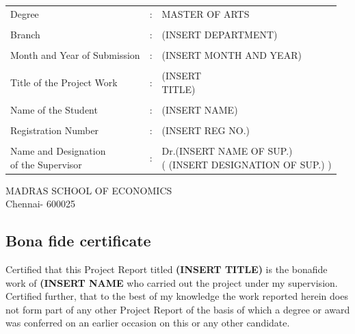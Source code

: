 \documentclass[12pt]{article}
\newenvironment{boldenv}
  {\bfseries}%
  {}%
\numberwithin{equation}{section}
\numberwithin{table}{section}
\numberwithin{figure}{section}
\begin{document}


\newpage
{}

\begin{boldenv}


\begin{center}
\begin{tabularx}{\textwidth} {l l l}
Degree     & : &  MASTER OF ARTS\\
\\
Branch     & : & (INSERT DEPARTMENT) \\
\\
Month and Year of Submission & : &  (INSERT MONTH AND YEAR)\\
\\
Title of the Project Work  & : &  \makecell[tl]{(INSERT \\
TITLE)}\\
\\
Name of the Student & : & (INSERT NAME)\\
\\
Registration Number & : &  (INSERT REG NO.)\\
\\
\makecell[tl]{Name and Designation \\of the Supervisor} & : & \makecell[tl]{Dr.(INSERT NAME OF SUP.)\\ ( (INSERT DESIGNATION OF SUP.) )}
\end{tabularx}
\end{center}
\vspace{0.5cm}
\begin{FlushRight}
MADRAS SCHOOL OF ECONOMICS\\
Chennai- 600025
\end{FlushRight}
\end{boldenv}

\newpage
\begin{doublespace}
\begin{center}
    \section*{Bona fide certificate}
\end{center}
Certified that this Project Report titled \textbf{ (INSERT TITLE)} is the bonafide work of \textbf{(INSERT NAME} who carried out the project under my supervision. Certified further, that to the best of my knowledge the work reported herein does not form part of any other Project Report of the basis of which a degree or award was conferred on an earlier occasion on this or any other candidate.
\end{doublespace}
\end{document}
